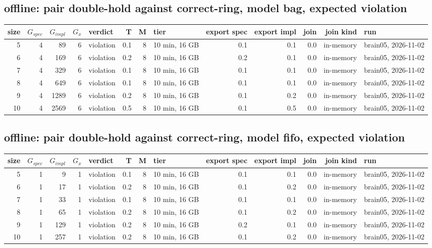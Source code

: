 \documentclass[10pt]{article}
\begin{document}
\subsection*{offline: pair \textsf{double-hold} against \textsf{correct-ring}, model bag, expected violation}
\begin{longtable}{@{}rrrrlrrlrrrrl@{}}
\toprule
size & $G_{\mathit{spec}}$ & $G_{\mathit{impl}}$ & $G_x$ & verdict & T & M & tier & export spec & export impl & join & join kind & run \\
\midrule
\endhead
\color{red} 5 & 4 & 89 & 6 & violation & 0.1 & 8 & 10 min, 16 GB & 0.1 & 0.1 & 0.0 & in-memory & brain05, 2026-11-02 \\
\color{red} 6 & 4 & 169 & 6 & violation & 0.2 & 8 & 10 min, 16 GB & 0.2 & 0.1 & 0.0 & in-memory & brain05, 2026-11-02 \\
\color{red} 7 & 4 & 329 & 6 & violation & 0.1 & 8 & 10 min, 16 GB & 0.1 & 0.1 & 0.0 & in-memory & brain05, 2026-11-02 \\
\color{red} 8 & 4 & 649 & 6 & violation & 0.1 & 8 & 10 min, 16 GB & 0.1 & 0.1 & 0.0 & in-memory & brain05, 2026-11-02 \\
\color{red} 9 & 4 & 1289 & 6 & violation & 0.2 & 8 & 10 min, 16 GB & 0.1 & 0.2 & 0.0 & in-memory & brain05, 2026-11-02 \\
\color{red} 10 & 4 & 2569 & 6 & violation & 0.5 & 8 & 10 min, 16 GB & 0.1 & 0.5 & 0.0 & in-memory & brain05, 2026-11-02 \\
\bottomrule
\end{longtable}
\subsection*{offline: pair \textsf{double-hold} against \textsf{correct-ring}, model fifo, expected violation}
\begin{longtable}{@{}rrrrlrrlrrrrl@{}}
\toprule
size & $G_{\mathit{spec}}$ & $G_{\mathit{impl}}$ & $G_x$ & verdict & T & M & tier & export spec & export impl & join & join kind & run \\
\midrule
\endhead
\color{red} 5 & 1 & 9 & 1 & violation & 0.1 & 8 & 10 min, 16 GB & 0.1 & 0.1 & 0.0 & in-memory & brain05, 2026-11-02 \\
\color{red} 6 & 1 & 17 & 1 & violation & 0.2 & 8 & 10 min, 16 GB & 0.1 & 0.2 & 0.0 & in-memory & brain05, 2026-11-02 \\
\color{red} 7 & 1 & 33 & 1 & violation & 0.1 & 8 & 10 min, 16 GB & 0.1 & 0.1 & 0.0 & in-memory & brain05, 2026-11-02 \\
\color{red} 8 & 1 & 65 & 1 & violation & 0.2 & 8 & 10 min, 16 GB & 0.1 & 0.2 & 0.0 & in-memory & brain05, 2026-11-02 \\
\color{red} 9 & 1 & 129 & 1 & violation & 0.2 & 8 & 10 min, 16 GB & 0.2 & 0.1 & 0.0 & in-memory & brain05, 2026-11-02 \\
\color{red} 10 & 1 & 257 & 1 & violation & 0.2 & 8 & 10 min, 16 GB & 0.1 & 0.2 & 0.0 & in-memory & brain05, 2026-11-02 \\
\bottomrule
\end{longtable}
\end{document}
